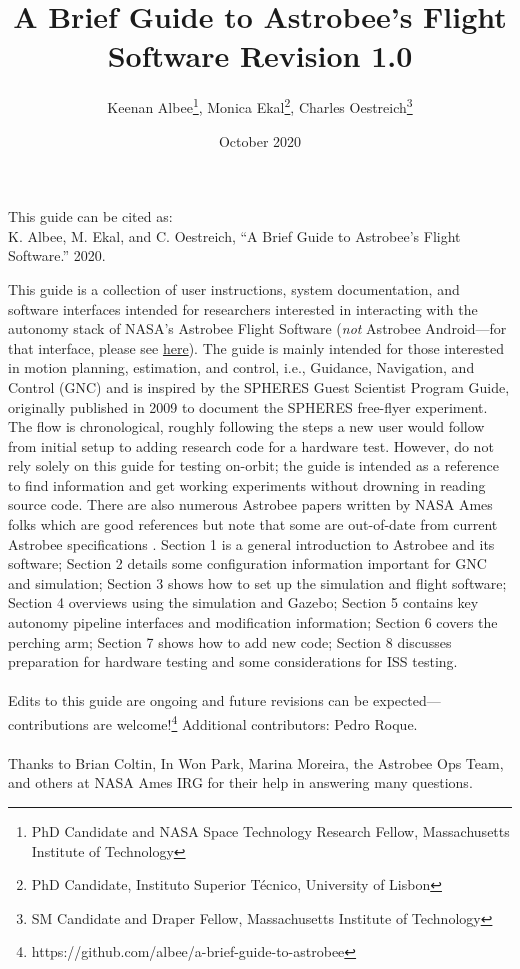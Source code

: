 \documentclass{article}
\begin{document}
\title{A Brief Guide to Astrobee's Flight Software
        \Large Revision 1.0 }
\author{Keenan Albee\footnote{PhD Candidate and NASA Space Technology Research Fellow, Massachusetts Institute of Technology}, Monica Ekal\footnote{PhD Candidate, Instituto Superior Técnico, University of Lisbon}, Charles Oestreich\footnote{SM Candidate and Draper Fellow, Massachusetts Institute of Technology}}
\date{October 2020}
\vspace{20cm}
\maketitle
\vfill
\begin{center}
This guide can be cited as:\\
K. Albee, M. Ekal, and C. Oestreich, “A Brief Guide to Astrobee’s Flight Software.” 2020.
\end{center}
\newpage
This guide is a collection of user instructions, system documentation, and software interfaces intended for researchers interested in interacting with the autonomy stack of NASA's Astrobee Flight Software (\textit{not} Astrobee Android---for that interface, please see \href{https://github.com/nasa/astrobee\_android}{here}). The guide is mainly intended for those interested in motion planning, estimation, and control, i.e., Guidance, Navigation, and Control (GNC) and is inspired by the SPHERES Guest Scientist Program Guide, originally published in 2009 to document the SPHERES free-flyer experiment. The flow is chronological, roughly following the steps a new user would follow from initial setup to adding research code for a hardware test. However, do not rely solely on this guide for testing on-orbit; the guide is intended as a reference to find information and get working experiments without drowning in reading source code. There are also numerous Astrobee papers written by NASA Ames folks which are good references but note that some are out-of-date from current Astrobee specifications \cite{Park2017a} \cite{Smith2016} \cite{Watterson2016} \cite{Fluckiger} \cite{Coltin2016a} \cite{Kim2017} \cite{Bualat2015} \cite{Lee2018}. Section 1 is a general introduction to Astrobee and its software; Section 2 details some configuration information important for GNC and simulation; Section 3 shows how to set up the simulation and flight software; Section 4 overviews using the simulation and Gazebo; Section 5 contains key autonomy pipeline interfaces and modification information; Section 6 covers the perching arm; Section 7 shows how to add new code; Section 8 discusses preparation for hardware testing and some considerations for ISS testing. 
\\
\\
\indent Edits to this guide are ongoing and future revisions can be expected---contributions are welcome!\footnote{https://github.com/albee/a-brief-guide-to-astrobee} Additional contributors: Pedro Roque.
\\
\\
\indent Thanks to Brian Coltin, In Won Park, Marina Moreira, the Astrobee Ops Team, and others at NASA Ames IRG for their help in answering many questions.
\end{document}
